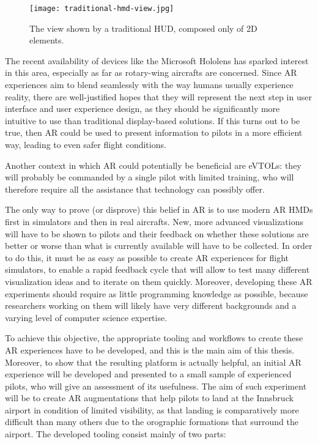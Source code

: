\begin{figure}
  \centering
  \texttt{[image: traditional-hmd-view.jpg]}
  \caption{The view shown by a traditional \gls{HUD}, composed only of 2D elements.}\label{fig:traditional_hmd_view.png}
\end{figure}

The recent availability of devices like the Microsoft Hololens has sparked interest in this area, especially as far as rotary-wing aircrafts are concerned\cite{walko_integration_2020, walko_increasing_2021}. Since \acrlong{AR} experiences aim to blend seamlessly with the way humans usually experience reality, there are well-justified hopes that they will represent the next step in user interface and user experience design, as they should be significantly more intuitive to use than traditional display-based solutions. If this turns out to be true, then \gls{AR} could be used to present information to pilots in a more efficient way, leading to even safer flight conditions.

Another context in which \gls{AR} could potentially be beneficial are \glspl{eVTOL}: they will probably be commanded by a single pilot with limited training, who will therefore require all the assistance that technology can possibly offer.

The only way to prove (or disprove) this belief in \acrlong{AR} is to use modern \gls{AR} \glspl{HMD} first in simulators and then in real aircrafts. New, more advanced visualizations will have to be shown to pilots and their feedback on whether these solutions are better or worse than what is currently available will have to be collected. In order to do this, it must be as easy as possible to create \gls{AR} experiences for flight simulators, to enable a rapid feedback cycle that will allow to test many different visualization ideas and to iterate on them quickly. Moreover, developing these \gls{AR} experiments should require as little programming knowledge as possible, because researchers working on them will likely have very different backgrounds and a varying level of computer science expertise. 

To achieve this objective, the appropriate tooling and workflows to create these \gls{AR} experiences have to be developed, and this is the main aim of this thesis. Moreover, to show that the resulting platform is actually helpful, an initial \gls{AR} experience will be developed and presented to a small sample of experienced pilots, who will give an assessment of its usefulness. The aim of such experiment will be to create \gls{AR} augmentations that help pilots to land at the Innsbruck airport in condition of limited visibility, as that landing is comparatively more difficult than many others due to the orographic formations that surround the airport. The developed tooling consist mainly of two parts:

